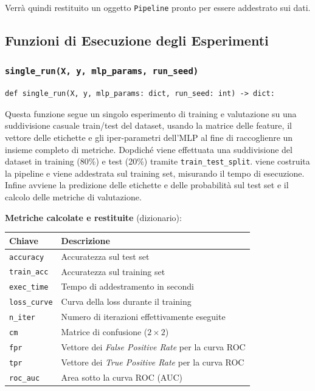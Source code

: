 \documentclass[11pt,a4paper]{article}
\begin{document}
Verrà quindi restituito un oggetto \texttt{Pipeline} pronto per essere addestrato sui dati.

\subsection{Funzioni di Esecuzione degli Esperimenti}

\subsubsection{\texttt{single\_run(X, y, mlp\_params, run\_seed)}}

\begin{lstlisting}
def single_run(X, y, mlp_params: dict, run_seed: int) -> dict:
\end{lstlisting}

Questa funzione segue un singolo esperimento di training e valutazione su una
suddivisione casuale train/test del dataset, usando la matrice delle feature, il vettore delle etichette e gli iper-parametri dell'MLP
al fine di raccoglienre un insieme completo di metriche. 
Dopdiché viene effettuata una suddivisione del dataset in training (80\%) e test (20\%) tramite \texttt{train\_test\_split}.
viene costruita la pipeline e viene addestrata sul training set, misurando il tempo di esecuzione.
Infine avviene la predizione delle etichette e delle probabilità sul test set e il calcolo delle metriche di valutazione.

\textbf{Metriche calcolate e restituite} (dizionario):
\begin{center}
\begin{tabular}{ll}
\toprule
\textbf{Chiave} & \textbf{Descrizione} \\
\midrule
\texttt{accuracy}   & Accuratezza sul test set \\
\texttt{train\_acc} & Accuratezza sul training set \\
\texttt{exec\_time} & Tempo di addestramento in secondi \\
\texttt{loss\_curve} & Curva della loss durante il training \\
\texttt{n\_iter}    & Numero di iterazioni effettivamente eseguite \\
\texttt{cm}         & Matrice di confusione ($2 \times 2$) \\
\texttt{fpr}        & Vettore dei \textit{False Positive Rate} per la curva ROC \\
\texttt{tpr}        & Vettore dei \textit{True Positive Rate} per la curva ROC \\
\texttt{roc\_auc}   & Area sotto la curva ROC (AUC) \\
\bottomrule
\end{tabular}
\end{center}
\end{document}
